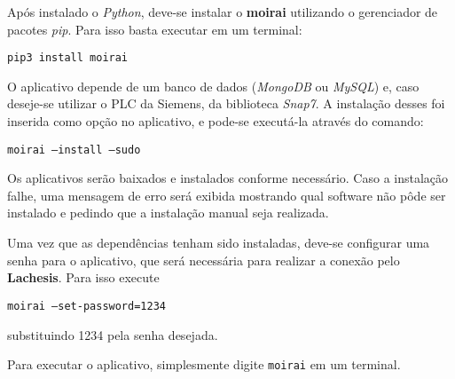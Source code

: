 Após instalado o \textit{Python}, deve-se instalar o \textbf{moirai} utilizando
o gerenciador de pacotes \textit{pip}. Para isso basta executar em um terminal:

\texttt{pip3 install moirai}

O aplicativo depende de um banco de dados (\textit{MongoDB} ou \textit{MySQL})
e, caso deseje-se utilizar o PLC da Siemens, da biblioteca \textit{Snap7}. A
instalação desses foi inserida como opção no aplicativo, e pode-se executá-la
através do comando:

\texttt{moirai --install --sudo}

Os aplicativos serão baixados e instalados conforme necessário. Caso a
instalação falhe, uma mensagem de erro será exibida mostrando qual software não
pôde ser instalado e pedindo que a instalação manual seja realizada.

Uma vez que as dependências tenham sido instaladas, deve-se configurar uma senha
para o aplicativo, que será necessária para realizar a conexão pelo
\textbf{Lachesis}. Para isso execute

\texttt{moirai --set-password=1234}

substituindo 1234 pela senha desejada.

Para executar o aplicativo, simplesmente digite \texttt{moirai} em um
terminal.

